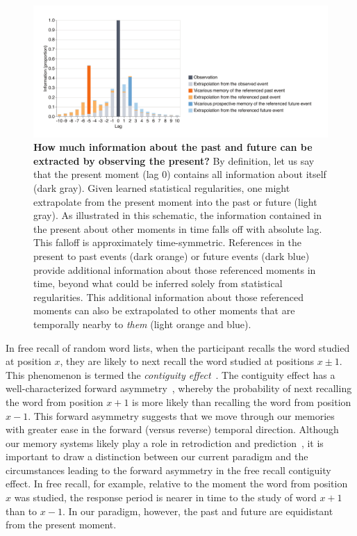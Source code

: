 \documentclass[10pt]{article}
\begin{document}
\begin{figure}[tp]
  \centering
  \includegraphics[width=\textwidth]{discussion}
  \caption{\textbf{How much information about the past and future can be extracted by observing the present?}  By definition, let us say that the present moment (lag 0) contains all information about itself (dark gray).  Given learned statistical regularities, one might extrapolate from the present moment into the past or future (light gray).  As illustrated in this schematic, the information contained in the present about other moments in time falls off with absolute lag.  This falloff is approximately time-symmetric.  References in the present to past events (dark orange) or future events (dark blue) provide additional information about those referenced moments in time, beyond what could be inferred solely from statistical regularities.  This additional information about those referenced moments can also be extrapolated to other moments that are temporally nearby to \textit{them} (light orange and blue).}
  \label{fig:discussion}
\end{figure}

In free recall of random word lists, when the participant recalls the word studied at position $x$, they are likely to next recall the word studied at positions $x \pm 1$.  This phenomenon is termed the \textit{contiguity effect}~\citep{Kaha96}.  The contiguity effect has a well-characterized forward asymmetry~\citep{KahaEtal22}, whereby the probability of next recalling the word from position $x + 1$ is more likely than recalling the word from position $x - 1$.  This forward asymmetry suggests that we move through our memories with greater ease in the forward (versus reverse) temporal direction.  Although our memory systems likely play a role in retrodiction and prediction~\citep{MomeHowa18, BarrEtal20, ChowEtal16}, it is important to draw a distinction between our current paradigm and the circumstances leading to the forward asymmetry in the free recall contiguity effect.  In free recall, for example, relative to the moment the word from position $x$ was studied, the response period is nearer in time to the study of word $x + 1$ than to $x - 1$.  In our paradigm, however, the past and future are equidistant from the present moment.
\end{document}
